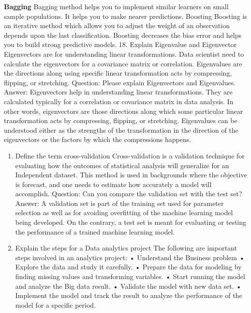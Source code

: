 \documentclass[
]{book}
\begin{document}
\textbf{Bagging}
Bagging method helps you to implement similar learners on small sample populations. It helps you to make nearer predictions.
Boosting
Boosting is an iterative method which allows you to adjust the weight of an observation depends upon the last classification. Boosting decreases the bias error and helps you to build strong predictive models.
18. Explain Eigenvalue and Eigenvector
Eigenvectors are for understanding linear transformations. Data scientist need to calculate the eigenvectors for a covariance matrix or correlation. Eigenvalues are the directions along using specific linear transformation acts by compressing, flipping, or stretching.
Question: Please explain Eigenvectors and Eigenvalues.
Answer: Eigenvectors help in understanding linear transformations. They are calculated typically for a correlation or covariance matrix in data analysis.
In other words, eigenvectors are those directions along which some particular linear transformation acts by compressing, flipping, or stretching.
Eigenvalues can be understood either as the strengths of the transformation in the direction of the eigenvectors or the factors by which the compressions happens.

\begin{enumerate}
\def\labelenumi{\arabic{enumi}.}
\setcounter{enumi}{18}
\item
  Define the term cross-validation
  Cross-validation is a validation technique for evaluating how the outcomes of statistical analysis will generalize for an Independent dataset. This method is used in backgrounds where the objective is forecast, and one needs to estimate how accurately a model will accomplish.
  Question: Can you compare the validation set with the test set?
  Answer: A validation set is part of the training set used for parameter selection as well as for avoiding overfitting of the machine learning model being developed. On the contrary, a test set is meant for evaluating or testing the performance of a trained machine learning model.
\item
  Explain the steps for a Data analytics project
  The following are important steps involved in an analytics project:
  • Understand the Business problem
  • Explore the data and study it carefully.
  • Prepare the data for modeling by finding missing values and transforming variables.
  • Start running the model and analyze the Big data result.
  • Validate the model with new data set.
  • Implement the model and track the result to analyze the performance of the model for a specific period.
\end{enumerate}
\end{document}
